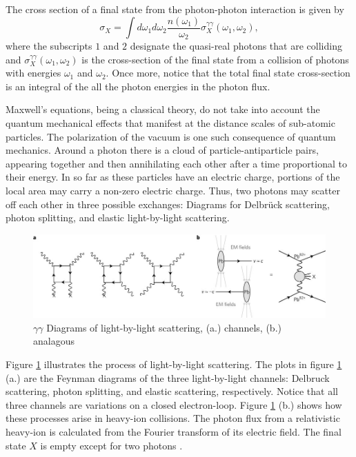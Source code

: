 The cross section of a final state from the photon-photon interaction is given by
\begin{equation}
\sigma_X = \int d \omega_1 d \omega_2 \frac{n(\omega_1)}{\omega_2} \sigma_X^{\gamma\gamma}(\omega_1, \omega_2),
\end{equation}
where the subscripts $1$ and $2$ designate the quasi-real photons that are colliding and 
$\sigma_X^{\gamma\gamma}(\omega_1, \omega_2)$ is the cross-section of the final state from a collision of photons with energies $\omega_1$ and $\omega_2$. Once more, notice that the total final state cross-section is an integral of the all the photon energies in the photon flux. 

Maxwell's equations, being a classical theory, do not take into account the quantum mechanical effects that manifest at the distance scales of sub-atomic particles. The polarization of the vacuum is one such consequence of quantum mechanics. Around a photon there is a cloud of particle-antiparticle pairs, appearing together and then annihilating each other after a time proportional to their energy. In so far as these particles have an electric charge, portions of the local area may carry a non-zero electric charge. Thus, two photons may scatter off each other in three possible exchanges: Diagrams for Delbrück scattering, photon splitting, and elastic light-by-light scattering. 

\begin{figure}[]
\begin{centering}
\includegraphics[width=7in]{Chapter2/importfigs/nphys4208-f1.jpg}
\par\end{centering}
\caption{$\gamma \gamma$ Diagrams of light-by-light scattering, (a.) channels, (b.) analagous \cite{Aaboud:2017bwk} \label{fig:ggDiag}}
\end{figure}

Figure \ref{fig:ggDiag} illustrates the process of light-by-light scattering. The plots in figure \ref{fig:ggDiag} (a.) are the Feynman diagrams of the three light-by-light channels: Delbruck scattering, photon splitting, and elastic scattering, respectively. Notice that all three channels are variations on a closed electron-loop. Figure \ref{fig:ggDiag} (b.) shows how these processes arise in heavy-ion collisions. The photon flux from a relativistic heavy-ion is calculated from the Fourier transform of its electric field. The final state $X$ is empty except for two photons \cite{Aaboud:2017bwk}. 


